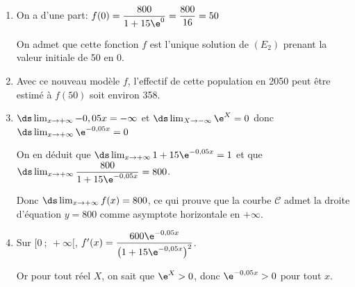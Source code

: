 	\begin{enumerate}
		\item 
On a d'une part:		$f(0)=\dfrac{800}{1+15 \e^{0}} = \dfrac{800}{16}=50$
		

On admet que cette fonction $f$ est l'unique solution de $(E_{2})$ prenant la valeur initiale de 50 en 0.

		\item Avec ce nouveau modèle $f$,  l'effectif de cette population en 2050 peut être estimé à $f(50)$ soit environ 358.
		


		\item 
$\ds\lim_{x\to +\infty} -0,05x = -\infty$ et
$\ds\lim_{X\to -\infty} \e^{X}=0$ donc 
$\ds\lim_{x\to +\infty} \e^{-0,05x} = 0$

On en déduit  que 
$\ds\lim_{x\to +\infty} 1+15\e^{-0,05x} = 1$ et que
$\ds\lim_{x\to +\infty} \dfrac{800}{1+15\e^{-0,05x}} = 800$.

Donc $\ds\lim_{x\to +\infty} f(x)=800$, ce qui prouve que la courbe $\mathcal{C}$ admet la droite d'équation $y=800$ comme asymptote horizontale en $+\infty$.
		
		\item 
Sur $[0 ~;~+\infty[$,  $f'(x)=\dfrac{600 \e^{-0,05 x}}{\left(1+15 \e^{-0,05 x}\right)^{2}}$.

Or pour tout réel $X$, on sait que $\e^{X}>0$, donc $\e^{-0,05x}>0$ pour tout $x$.


\end{enumerate}
